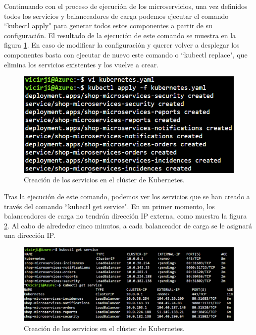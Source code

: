 \documentclass[11pt,spanish,listoffigures]{tfgetsinf}
\begin{document}
Continuando con el proceso de ejecución de los microservicios, una vez definidos todos los servicios y balanceadores de carga podemos ejecutar el comando ``kubectl apply" para generar todos estos componentes a partir de su configuración. El resultado de la ejecución de este comando se muestra en la figura \ref{fig:KubernetesApply}. En caso de modificar la configuración y querer volver a desplegar los componentes basta con ejecutar de nuevo este comando o ``kubectl replace", que elimina los servicios existentes y los vuelve a crear.

\begin{figure}[h]
\centering
\includegraphics[scale=0.8]{KubernetesApply}
\caption{Creación de los servicios en el clúster de Kubernetes.}
\label{fig:KubernetesApply}
\end{figure}

\newpage

Tras la ejecución de este comando, podemos ver los servicios que se han creado a través del comando ``kubectl get service". En un primer momento, los balanceadores de carga no tendrán dirección IP externa, como muestra la figura \ref{fig:ServiciosKubernetes}. Al cabo de alrededor cinco minutos, a cada balanceador de carga se le asignará una dirección IP.

\begin{figure}[h]
\centering
\includegraphics[scale=0.55]{ServiciosKubernetes}
\caption{Creación de los servicios en el clúster de Kubernetes.}
\label{fig:ServiciosKubernetes}
\end{figure}
\end{document}
